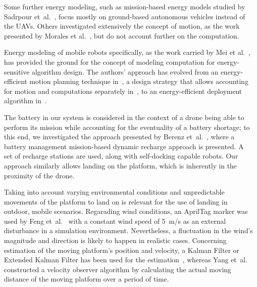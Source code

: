 \documentclass[conference]{IEEEtran}
\begin{document}
Some further energy modeling, such as mission-based energy models studied by Sadrpour et~al.~\cite{sadrpour2013experimental, sadrpour2013mission}, focus mostly on ground-based autonomous vehicles instead of the UAVs. Others investigated extensively the concept of motion, as the work presented by Morales et al.~\cite{morales2009power}, but do not account further on the computation.

Energy modeling of mobile robots specifically, as the work carried by Mei et al.~\cite{mei2006deployment, mei2005case, mei2004energy}, has provided the ground for the concept of modeling computation for energy-sensitive algorithm design. The authors' approach has evolved from an energy-efficient motion planning technique in~\cite{mei2004energy}, a design strategy that allows accounting for motion and computations separately in~\cite{mei2005case}, to an energy-efficient deployment algorithm in~\cite{mei2006deployment}.

The battery in our system is considered in the context of a drone being able to perform its mission while accounting for the eventuality of a battery shortage; to this end, we investigated the approach presented by Berenz et~al.~\cite{berenz2012autonomous}, where a battery management mission-based dynamic recharge approach is presented. A set of recharge stations are used, along with self-docking capable robots. Our approach similarly allows landing on the platform, which is inherently in the proximity of the drone.

Taking into account varying environmental conditions and unpredictable movements of the platform to land on is relevant for the use of landing in outdoor, mobile scenarios.
Regarading wind conditions, an AprilTag marker was used by Feng et~al.~\cite{feng2018autonomous} with a constant wind speed of 5~m/s as an external disturbance in a simulation environment. Nevertheless, a fluctuation in the wind's magnitude and direction is likely to happen in realistic cases.
Concerning estimation of the moving platform's position and velocity, a Kalman Filter or Extended Kalman Filter has been used for the estimation~\cite{araar2017vision,feng2018autonomous, falanga2017vision}, whereas Yang et~al.~\cite{yang2018hybrid} constructed a velocity observer algorithm by calculating the actual moving distance of the moving platform over a period of time. 
\end{document}
